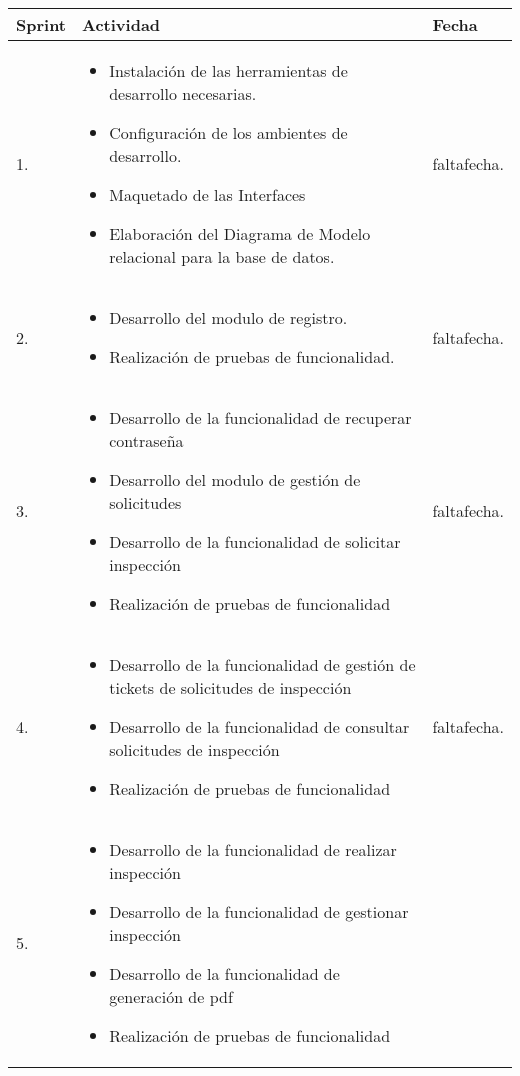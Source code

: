 \begin{table}[htb]	
\begin{center}
\begin{tabular}{ | m{8cm} | m{8cm}| m{8cm}| } 
 \hline
 Sprint & Actividad & Fecha \\
 \hline
 1. & 
 \begin{itemize}
 	\item Instalación de las herramientas de desarrollo necesarias.
 	\item Configuración de los ambientes de desarrollo.
 	\item Maquetado de las Interfaces
 	\item Elaboración del Diagrama de Modelo relacional para la base de datos.
 \end{itemize}


 & faltafecha.\\
 \hline
 2. & 
 \begin{itemize}
 	\item Desarrollo del modulo de registro.
 	\item Realización de pruebas de funcionalidad.
 \end{itemize}


 & faltafecha.\\
 \hline
 3. & 
 \begin{itemize}
 	\item Desarrollo de la funcionalidad de recuperar contraseña
 	\item Desarrollo del modulo de gestión de solicitudes
 	\item Desarrollo de la funcionalidad de solicitar inspección
 	\item Realización de pruebas de funcionalidad
 \end{itemize}


 & faltafecha.\\
 \hline
 4. & 
 \begin{itemize}
 	\item Desarrollo de la funcionalidad de gestión de tickets de solicitudes de inspección
 	\item Desarrollo de la funcionalidad de consultar solicitudes de inspección
 	\item Realización de pruebas de funcionalidad
 \end{itemize}


 & faltafecha.\\
 \hline
 5. & 
 \begin{itemize}
 	\item Desarrollo de la funcionalidad de realizar inspección
 	\item Desarrollo de la funcionalidad de gestionar inspección
 	\item Desarrollo de la funcionalidad de generación de pdf
 	\item Realización de pruebas de funcionalidad
 \end{itemize}



\end{tabular}
\end{center}
\end{table}
